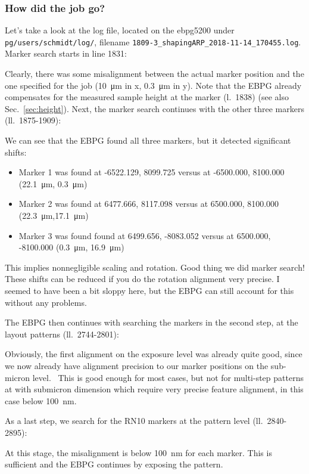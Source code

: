 \subsubsection{How did the job go?}
Let's take a look at the log file, located on the ebpg5200 under \texttt{pg/users/schmidt/log/}, filename \texttt{1809-3\_shapingARP\_2018-11-14\_170455.log}.
%
Marker search starts in line 1831:
%

%
Clearly, there was some misalignment between the actual marker position and the one specified for the job (\SI{10}{\micro\meter} in x, \SI{0.3}{\micro\meter} in y).
%
Note that the EBPG already compensates for the measured sample height at the marker (l.~1838) (see also Sec.~\ref{sec:height}).
%
Next, the marker search continues with the other three markers (ll.~1875-1909):
%

%
We can see that the EBPG found all three markers, but it detected significant shifts:
\begin{itemize}
	\item Marker 1 was found at -6522.129, 8099.725 versus at -6500.000, 8100.000 (\SI{22.1}{\micro\meter}, \SI{0.3}{\micro\meter})
	\item Marker 2 was found at 6477.666, 8117.098 versus at 6500.000, 8100.000 (\SI{22.3}{\micro\meter},\SI{17.1}{\micro\meter})
	\item Marker 3 was found found at 6499.656, -8083.052 versus at 6500.000, -8100.000 (\SI{0.3}{\micro\meter}, \SI{16.9}{\micro\meter})
\end{itemize}
This implies nonnegligible scaling and rotation.
%
Good thing we did marker search! 
%
These shifts can be reduced if you do the rotation alignment very precise. 
%
I seemed to have been a bit sloppy here, but the EBPG can still account for this without any problems.

The EBPG then continues with searching the markers in the second step, at the layout patterns (ll.~2744-2801):
%

%
Obviously, the first alignment on the exposure level was already quite good, since we now already have alignment precision to our marker positions on the sub-micron level.~
%
This is good enough for most cases, but not for multi-step patterns at with submicron dimension which require very precise feature alignment, in this case below \SI{100}{\nano\meter}.

As a last step, we search for the RN10 markers at the pattern level (ll.~2840-2895):
%

%
At this stage, the misalignment is below \SI{100}{\nano\meter} for each marker. 
%
This is sufficient and the EBPG continues by exposing the pattern.



